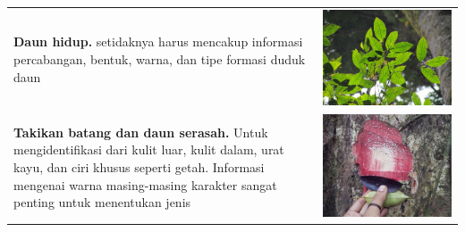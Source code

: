 \documentclass[
]{book}
\begin{document}
\begin{longtable}[]{@{}
  >{\raggedright\arraybackslash}p{}
  >{\raggedright\arraybackslash}p{}@{}}
\textbf{Daun hidup.} setidaknya harus mencakup informasi percabangan, bentuk, warna, dan tipe formasi duduk daun & \includegraphics{images/gkj2.jpg} \\
\textbf{Takikan batang dan daun serasah.} Untuk mengidentifikasi dari kulit luar, kulit dalam, urat kayu, dan ciri khusus seperti getah. Informasi mengenai warna masing-masing karakter sangat penting untuk menentukan jenis & \includegraphics{images/gkj3.jpg} \\

\end{longtable}
\end{document}
